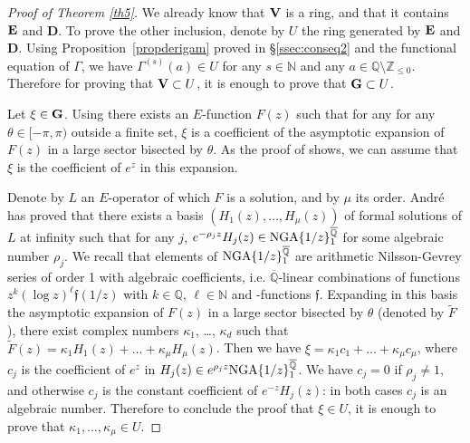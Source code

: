 \documentclass[reqno,12pt]{article}
\numberwithin{equation}{section}
\theoremstyle{remark}
\newcommand{\N}{\mathbb{N}}
\newcommand{\Z}{\mathbb{Z}}
\newcommand{\Q}{\mathbb{Q}}
\newcommand{\Qbar}{\overline{\mathbb Q}}
\newcommand{\tantie}{{\fontencoding{OT2}\fontfamily{wncyr}\selectfont\CYREREV}}
\newcommand{\antie}{\text{\tantie}}
\newcommand{\GG}{{\bf G}}
\newcommand{\VV}{{\bf V}}
\newcommand{\EE}{{\bf E}}
\newcommand{\fgo}{\mathfrak{f}}
\begin{document}
\begin{proof}[Proof of Theorem \ref{th5}] 
We already know that $\VV$ is a ring, and that it contains $\EE$ and  {\bf D}. To prove the other inclusion, denote by $U$ the ring generated by $\EE$ and  {\bf D}. Using Proposition~\ref{propderigam} proved in \S \ref{ssec:conseq2} and the functional equation of $\Gamma$, we have $\Gamma^{(s)}(a) \in U $ for any  $s\in\N$ and any $a\in\Q\setminus\Z_{\leq 0}$.   Therefore for proving that $\VV\subset U$, it is enough to prove that $\GG  \subset U$.

Let $\xi\in \GG$. Using \cite[Theorem 3]{probsiegel} there exists an $E$-function $F(z)$
such that for any for any $\theta\in[-\pi,\pi)$ 
outside a finite set, $\xi$  is a coefficient of the asymptotic expansion of $F(z)$ in a large sector
bisected by  $\theta$. As the proof of  \cite[Theorem 3]{probsiegel}  shows, we can assume that $\xi $ is the coefficient of $e^z$ in this expansion. 

Denote by $L$ an $E$-operator of which $F$ is a solution, and by $\mu$ its order. André has proved \cite{andre} that there exists a basis $(H_1(z),\ldots,H_\mu(z))$ of formal solutions of $L$ at infinity such that for any $ j$, $e^{-\rho_j z}H_j(z)\in {\rm NGA}\{1/z\}_1^{\Qbar}$ for some algebraic number $\rho_j$. We recall that elements of $ {\rm NGA}\{1/z\}_1^{\Qbar}$ are arithmetic Nilsson-Gevrey series of order 1 with algebraic coefficients, i.e. $\Qbar$-linear combinations of functions $z^k (\log z)^\ell \fgo(1/z)$ with $k\in\Q$, $\ell\in\N$ and \antie-functions $\fgo$. Expanding   in this basis the asymptotic expansion of $F(z)$ in a large   sector
bisected by  $\theta$ (denoted by $\widetilde F$), there exist complex numbers $\kappa_1$, \ldots, $\kappa_d$ such that $\widetilde F(z)= \kappa_1 H_1(z) + \ldots +  \kappa_\mu H_\mu(z)$. Then we have $\xi =  \kappa_1  c_1 + \ldots +  \kappa_\mu c_\mu$, where $c_j$ is the coefficient of $e^z $ in $H_j(z)\in e^{ \rho_j z}{\rm NGA}\{1/z\}_1^{\Qbar}$. We have $c_j = 0$ if $\rho_j\neq 1$, and otherwise $c_j $ is the constant coefficient of $e^{-z}H_j(z)$: in both cases $c_j$ is an algebraic number. Therefore to conclude the proof that $\xi\in U$, it is enough to prove that $\kappa_1  ,  \ldots ,  \kappa_\mu \in U$. 


\end{proof}
\end{document}
